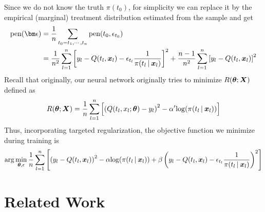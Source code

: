 Since we do not know the truth $\pi(t_0)$, for simplicity we can replace it by the empirical (marginal) treatment distribution estimated from the sample and get
\begin{equation*}
    \begin{split}
        \text{pen}(\bm\epsilon)&=\frac{1}{n}\sum_{t_0=t_1,\cdots,t_n}\text{pen}(t_0,\epsilon_{t_0})
        \\&
        =\frac{1}{n^2}\sum_{l=1}^n\left[y_l-Q(t_l,\x_l)-\epsilon_{t_l}\frac{1}{\pi(t_l\C\x_l)}\right]^2
        +\frac{n-1}{n^2}\sum_{l=1}^n\left[y_l-Q(t_l,\x_l)\right]^2
    \end{split}
\end{equation*}
Recall that originally, our neural network originally tries to minimize $R(\boldsymbol{\theta};\boldsymbol{X})$ defined as 
\begin{equation}
    R(\boldsymbol{\theta};\boldsymbol{X}) = \frac{1}{n}\sum_{l=1}^n\left[\left(Q(t_l,x_l;\boldsymbol{\theta})-y_l\right)^2-\alpha'{\log(\pi(t_l\,|\: \boldsymbol{x}_l))}\right]
\end{equation}
Thus, incorporating targeted regularization, the objective function we minimize during training is
\begin{equation}\label{eq:targeted_reg}
    \arg\min_{\boldsymbol{\theta},\epsilon} \frac{1}{n}\sum_{l=1}^n
    \left[\left(y_l-Q(t_l,\boldsymbol{x}_l)\right)^2 -\alpha{\log(\pi(t_l\,|\:\boldsymbol{x}_l))}+ \beta\left(y_l-Q(t_l,\boldsymbol{x}_l)-\epsilon_{t_l}\frac{1}{\pi(t_l\,|\:\boldsymbol{x}_l)}\right)^2\right]
\end{equation}
\fi

\section{Related Work}

